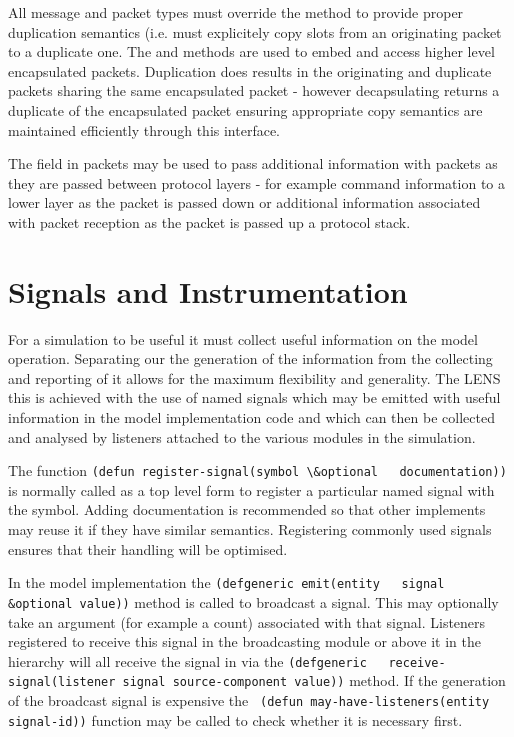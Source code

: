 \documentclass[a4paper,11pt,twoside,openany]{report}
\newcommand{\acr}[1]{\acrshort{#1}}
\begin{document}
All message and packet types must override the  method
to provide proper duplication semantics (i.e. must explicitely copy
slots from an originating packet to a duplicate one. The
 and  methods are used to embed and
access higher level encapsulated packets. Duplication does results in
the originating and duplicate packets sharing the same encapsulated
packet - however decapsulating returns a duplicate of the encapsulated
packet ensuring appropriate copy semantics are maintained
efficiently through this interface.

The  field in packets may be used to pass additional
information with packets as they are passed between protocol layers -
for example command information to a lower layer as the packet is
passed down or additional information associated with packet reception
as the packet is passed up a protocol stack.

\chapter{Signals and Instrumentation}

For a simulation to be useful it must collect useful information on
the model operation. Separating our the generation of the information
from the collecting and reporting of it allows for the maximum
flexibility and generality. The \acr{LENS} this is achieved with the use
of named signals which may be emitted with useful information in the
model implementation code and which can then be collected and analysed
by listeners attached to the various modules in the simulation.

The function \lstinline{(defun register-signal(symbol \&optional
  documentation))} is normally called as a top level form to register a
particular named signal with the symbol. Adding documentation is
recommended so that other implements may reuse it if they have similar
semantics. Registering commonly used signals ensures that their
handling will be optimised.

In the model implementation the \lstinline{(defgeneric emit(entity
  signal &optional value))} method is called to broadcast a
signal. This may optionally take an argument (for example a count)
associated with that signal. Listeners registered to receive this
signal in the broadcasting module or above it in the hierarchy will
all receive the signal in via the \lstinline{(defgeneric
  receive-signal(listener signal source-component value))} method.
If the generation of the broadcast signal is expensive the \lstinline{
(defun may-have-listeners(entity signal-id))} function may be called to
check whether it is necessary first.
\end{document}
